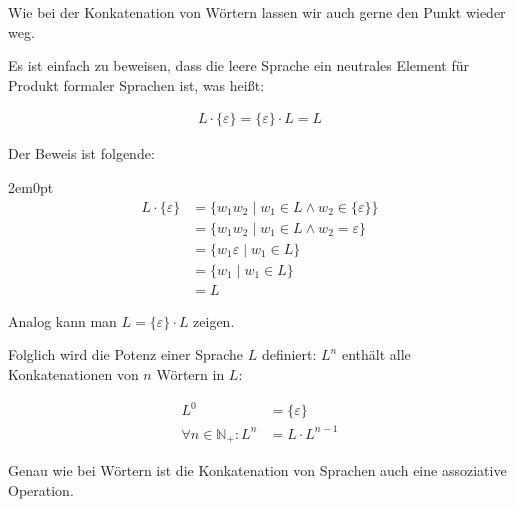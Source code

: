 \documentclass[12pt,a4paper,oneside]{article}
\newcommand{\emptyline}{\hspace*{\fill}}
\newcommand{\N}{\mathbb{N}}
\begin{document}
            Wie bei der Konkatenation von Wörtern lassen wir auch gerne den Punkt wieder weg.

            \emptyline

            Es ist einfach zu beweisen, dass die leere Sprache ein neutrales Element für Produkt formaler Sprachen ist,
            was heißt:

            \vspace{-1em}
            \begin{align*}
                L \cdot \{\varepsilon\} = \{\varepsilon\} \cdot L = L
            \end{align*}

            Der Beweis ist folgende:

            \begin{adjustwidth}{2em}{0pt}
                \vspace{-1em}
                \begin{align*}
                    L \cdot \{\varepsilon\} &= \{w_1w_2 \;|\; w_1 \in L \wedge w_2 \in \{\varepsilon\}\} \\
                                            &= \{w_1w_2 \;|\; w_1 \in L \wedge w_2 = \varepsilon\} \\
                                            &= \{w_1\varepsilon \;|\; w_1 \in L\} \\
                                            &= \{w_1 \;|\; w_1 \in L\} \\
                                            &= L
                \end{align*}

                Analog kann man $L = \{\varepsilon\} \cdot L$ zeigen.
            \end{adjustwidth}

            \emptyline

            Folglich wird die Potenz einer Sprache $L$ definiert: $L^n$ enthält alle Konkatenationen von $n$ Wörtern in $L$:

            \vspace{-1em}
            \begin{align*}
                                    L^0 &= \{\varepsilon\} \\
                \forall n \in \N_+: L^n &= L \cdot L^{n-1}
            \end{align*}

            Genau wie bei Wörtern ist die Konkatenation von Sprachen auch eine assoziative Operation.
\end{document}
